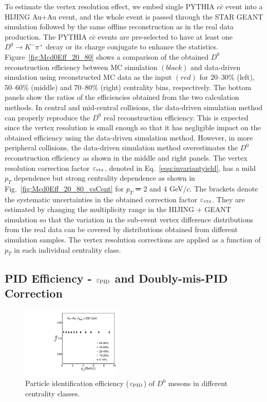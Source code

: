 \documentclass[%
 reprint,	
showpacs,
 amsmath,amssymb,
 aps,
 prc,
]{revtex4-1}
\providecommand{\DIFaddtex}[1]{{\protect\color{blue}\uwave{#1}}} %
\providecommand{\DIFdeltex}[1]{{\protect\color{red}\sout{#1}}}                      %
\providecommand{\DIFaddbegin}{} %
\providecommand{\DIFaddend}{} %
\providecommand{\DIFdelbegin}{} %
\providecommand{\DIFdelend}{} %
\providecommand{\DIFadd}[1]{\texorpdfstring{\DIFaddtex{#1}}{#1}} %
\providecommand{\DIFdel}[1]{\texorpdfstring{\DIFdeltex{#1}}{}} %
\begin{document}
To estimate the vertex resolution effect, we embed single PYTHIA $c\bar{c}$ event into a HIJING Au+Au event, and the whole event is passed through the STAR GEANT simulation followed by the same offline reconstruction as in the real data production. The PYTHIA $c\bar{c}$ events are pre-selected to have at least one $D^0\rightarrow K^-\pi^+$ decay or its charge conjugate to enhance the statistics. Figure~\ref{fig:Mcd0Eff_20_80} shows a comparison of the obtained $D^0$ reconstruction efficiency between MC simulation $(black)$ and data-driven simulation using reconstructed MC data as the input $(red)$ for 20--30\% (left), 50--60\% (middle) and 70--80\% (right) centrality bins, respectively. The bottom panels show the ratios of the efficiencies obtained from the two calculation methods. In central and mid-central collisions, the data-driven simulation method can properly reproduce the $D^0$ real reconstruction efficiency. This is expected since the vertex resolution is small enough so that it has negligible impact on the obtained efficiency using the data-driven simulation method. However, in more peripheral collisions, the data-driven simulation method overestimates the $D^0$ reconstruction efficiency as shown in the middle and right panels. The vertex resolution correction factor $\varepsilon_{\rm vtx}$, denoted in Eq.~\ref{equ:invariantyield}, has a mild $p_{T}$ dependence but strong centrality dependence as shown in Fig.~\ref{fig:Mcd0Eff_20_80_vsCent} for $p_T$ \DIFdelbegin \DIFdel{= }\DIFdelend \DIFaddbegin \DIFadd{$\approx$ }\DIFaddend 2 and 4 GeV/$c$. The brackets denote the systematic uncertainties in the obtained correction factor $\varepsilon_{\rm vtx}$. They are estimated by changing the multiplicity range in the HIJING + GEANT simulation so that the variation in the sub-event vertex difference distributions from the real data can be covered by distributions obtained from different simulation samples. The vertex resolution corrections are applied as a function of $p_{T}$ in each individual centrality class.

\subsection{PID Efficiency - $\varepsilon_{\rm PID}$ and Doubly-mis-PID Correction}
\label{correction:PID}

\begin{figure}
\centering
\includegraphics[width=0.43\textwidth]{fig/Datad0Eff_pid_10.pdf}
\caption{Particle identification efficiency ($\varepsilon_{\rm PID}$) of $D^0$ mesons in different centrality classes.}
\label{fig:Datad0Eff_pid} 
\end{figure}
\end{document}
